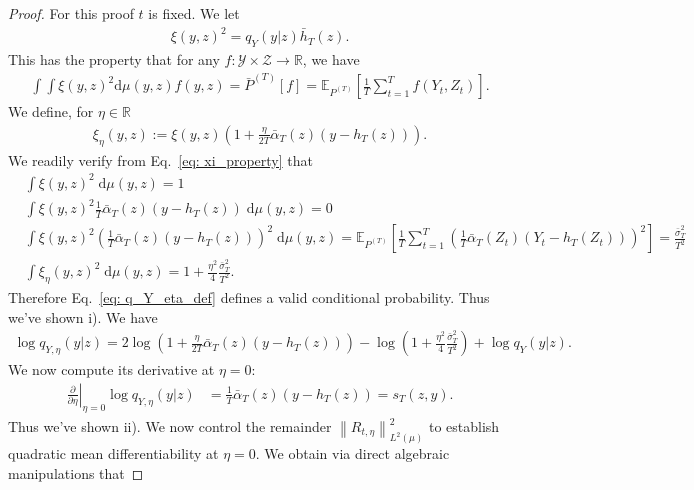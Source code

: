 \documentclass[11pt]{article}
\begin{document}
\begin{proof}
For this proof $t$ is fixed. We let 
    \begin{align*}
        \xi(y,z)^2 = q_Y(y|z)\bar{h}_T(z).
    \end{align*}
    This has the property that for any $f : \mathcal{Y}\times \mathcal{Z}\to \mathbb{R}$, we have
    \begin{align}
        \int \int \xi(y,z)^2\mathrm{d}\mu(y,z)f(y,z) = \bar{P}^{(T)}[f] = \mathbb{E}_{P^{(T)}}\left[\frac{1}{T}\sum_{t=1}^{T}f(Y_t, Z_t)\right]\label{eq: xi_property}. 
    \end{align}
    We define, for $\eta\in \mathbb{R}$
    \begin{align*}
        \xi_\eta (y,z) := \xi(y,z)\left(1 + \frac{\eta}{2T}\bar{\alpha}_T(z)(y - h_T(z))\right). 
    \end{align*}
    We readily verify from Eq.~\eqref{eq: xi_property} that 
    \begin{align*}
        &\int \xi(y,z)^2\;\mathrm{d}\mu(y,z) = 1\\
        &\int \xi(y,z)^2\frac{1}{T}\bar{\alpha}_T(z)(y - h_T(z))\;\mathrm{d}\mu(y,z) = 0\\
        &\int \xi(y,z)^2\left(\frac{1}{T}\bar{\alpha}_T(z)(y - h_T(z))\right)^2\;\mathrm{d}\mu(y,z) = \mathbb{E}_{P^{(T)}}\left[\frac{1}{T}\sum_{t=1}^{T}\left(\frac{1}{T}\bar{\alpha}_T(Z_t)(Y_t - h_T(Z_t))\right)^2\right] = \frac{\bar{\sigma}_T^2}{T^2}\\
        &\int \xi_{\eta}(y,z)^2\;\mathrm{d}\mu(y,z) = 1 + \frac{\eta^2}{4}\frac{\bar{\sigma}_T^2}{T^2}.
    \end{align*}
    Therefore Eq.~\eqref{eq: q_Y_eta_def} defines a valid conditional probability. Thus we've shown i). We have
    \begin{align*}
        \log q_{Y,\eta}(y|z) = 2\log \left(1 + \frac{\eta}{2T}\bar{\alpha}_T(z)(y - h_T(z))\right)- \log \left(1 + \frac{\eta^2}{4}\frac{\bar{\sigma}_T^2}{T^2}\right) + \log q_Y(y|z). 
    \end{align*}
    We now compute its derivative at $\eta = 0$:
    \begin{align*}
        \left.\frac{\partial}{\partial\eta}\right|_{\eta = 0}\log q_{Y,\eta}(y|z) &= \frac{1}{T}\bar{\alpha}_T(z)(y - h_T(z)) = s_T(z,y).
    \end{align*}
    Thus we've shown ii). We now control the remainder $\left\|R_{t,\eta}\right\|_{L^2(\mu)}^2$ to establish quadratic mean differentiability at $\eta = 0$. We obtain via direct algebraic manipulations that 

\end{proof}
\end{document}
